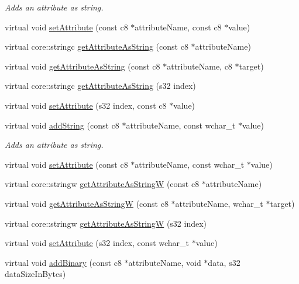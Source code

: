 \begin{DoxyCompactItemize}
\begin{DoxyCompactList}\small\item\em Adds an attribute as string. \end{DoxyCompactList}\item 
virtual void \hyperlink{classirr_1_1io_1_1_c_attributes_a242304d1cde52e8248b033e2ea573b78}{set\-Attribute} (const c8 $\ast$attribute\-Name, const c8 $\ast$value)
\item 
virtual core\-::stringc \hyperlink{classirr_1_1io_1_1_c_attributes_aa3e151ba0dd648df674f332e65483839}{get\-Attribute\-As\-String} (const c8 $\ast$attribute\-Name)
\item 
virtual void \hyperlink{classirr_1_1io_1_1_c_attributes_a12799158b6cb46f92498c4292a583f11}{get\-Attribute\-As\-String} (const c8 $\ast$attribute\-Name, c8 $\ast$target)
\item 
virtual core\-::stringc \hyperlink{classirr_1_1io_1_1_c_attributes_a3cc6b827e5afc0056cb132bb61394d2b}{get\-Attribute\-As\-String} (s32 index)
\item 
virtual void \hyperlink{classirr_1_1io_1_1_c_attributes_a90fa13ebc3cff790881b857f8336de41}{set\-Attribute} (s32 index, const c8 $\ast$value)
\item 
virtual void \hyperlink{classirr_1_1io_1_1_c_attributes_a9767565a17a2581fc887fba4a70cbd04}{add\-String} (const c8 $\ast$attribute\-Name, const wchar\-\_\-t $\ast$value)
\begin{DoxyCompactList}\small\item\em Adds an attribute as string. \end{DoxyCompactList}\item 
virtual void \hyperlink{classirr_1_1io_1_1_c_attributes_ad4f47a17331499d7fb3508d9f884ab2c}{set\-Attribute} (const c8 $\ast$attribute\-Name, const wchar\-\_\-t $\ast$value)
\item 
virtual core\-::stringw \hyperlink{classirr_1_1io_1_1_c_attributes_aa074d8dfc482e45e4a7ac278a60394a0}{get\-Attribute\-As\-String\-W} (const c8 $\ast$attribute\-Name)
\item 
virtual void \hyperlink{classirr_1_1io_1_1_c_attributes_ae88db618ee4e8ef65fb176683d2a4df3}{get\-Attribute\-As\-String\-W} (const c8 $\ast$attribute\-Name, wchar\-\_\-t $\ast$target)
\item 
virtual core\-::stringw \hyperlink{classirr_1_1io_1_1_c_attributes_a560824bcd9a2e2fb2cd9a72812395c1e}{get\-Attribute\-As\-String\-W} (s32 index)
\item 
virtual void \hyperlink{classirr_1_1io_1_1_c_attributes_aa8824e20d9467e2dbe980403cbd784df}{set\-Attribute} (s32 index, const wchar\-\_\-t $\ast$value)
\item 
\hypertarget{classirr_1_1io_1_1_c_attributes_a4706474b7154cc6cd74a7a2ec057fd9c}{virtual void \hyperlink{classirr_1_1io_1_1_c_attributes_a4706474b7154cc6cd74a7a2ec057fd9c}{add\-Binary} (const c8 $\ast$attribute\-Name, void $\ast$data, s32 data\-Size\-In\-Bytes)}\label{classirr_1_1io_1_1_c_attributes_a4706474b7154cc6cd74a7a2ec057fd9c}


\end{DoxyCompactItemize}
